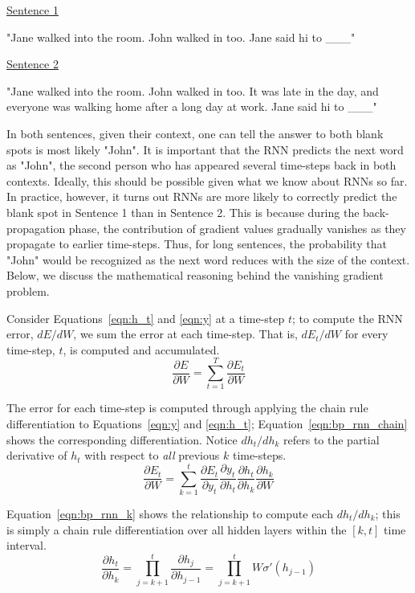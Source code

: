 \documentclass{tufte-handout}
\begin{document}
\null
\centering
\uline{Sentence 1}

"Jane walked into the room. John walked in too. Jane said hi to \_\_\_"

\null
\uline{Sentence 2}

"Jane walked into the room. John walked in too. It was late in the day, and everyone was walking home after a long day at work. Jane said hi to \_\_\_"

\null
\justify
In both sentences, given their context, one can tell the answer to both blank spots is most likely "John". It is important that the RNN predicts the next word as "John", the second person who has appeared several time-steps back in both contexts. Ideally, this should be possible given what we know about RNNs so far. In practice, however, it turns out RNNs are more likely to correctly predict the blank spot in Sentence 1 than in Sentence 2. This is because during the back-propagation phase, the contribution of gradient values gradually vanishes as they propagate to earlier time-steps. Thus, for long sentences, the probability that "John" would be recognized as the next word reduces with the size of the context. Below, we discuss the mathematical reasoning behind the vanishing gradient problem.

Consider Equations~\ref{eqn:h_t} and \ref{eqn:y} at a time-step $t$; to compute the RNN error, $dE/dW$, we sum the error at each time-step. That is, $dE_t/dW$ for every time-step, $t$, is computed and accumulated.
\begin{equation}
	\dfrac{\partial E}{\partial W} = \sum_{t=1}^{T}\dfrac{\partial E_t}{\partial W}
	\label{eqn:bp_rnn_error}
\end{equation}

The error for each time-step is computed through applying the chain rule differentiation to Equations~\ref{eqn:y} and \ref{eqn:h_t}; Equation~\ref{eqn:bp_rnn_chain} shows the corresponding differentiation. Notice $dh_t/dh_k$ refers to the partial derivative of $h_t$ with respect to \textit{all} previous $k$ time-steps.
\begin{equation}
	\dfrac{\partial E_t}{\partial W} = \sum_{k=1}^{t} \dfrac{\partial E_t}{\partial y_t} \dfrac{\partial y_t}{\partial h_t} \dfrac{\partial h_t}{\partial h_k} \dfrac{\partial h_k}{\partial W}
	\label{eqn:bp_rnn_chain}
\end{equation}

Equation~\ref{eqn:bp_rnn_k} shows the relationship to compute each $dh_t/dh_k$; this is simply a chain rule differentiation over all hidden layers within the $[k, t]$ time interval.
\begin{equation}
	\dfrac{\partial h_t}{\partial h_k} = \prod_{j=k+1}^{t}\dfrac{\partial h_j}{\partial h_{j-1}} = \prod_{j=k+1}^{t}W  \sigma'(h_{j-1})
	\label{eqn:bp_rnn_k}
\end{equation}
\end{document}
